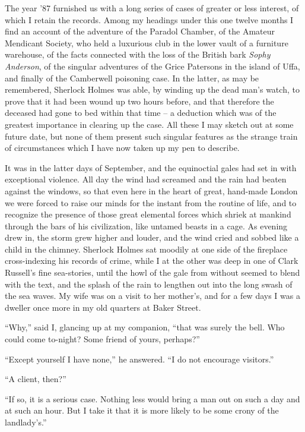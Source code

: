 The year ’87 furnished us with a long series of cases of
greater or less interest, of which I retain the records. Among
my headings under this one twelve months I find an account
of the adventure of the Paradol Chamber, of the Amateur
Mendicant Society, who held a luxurious club in the lower
vault of a furniture warehouse, of the facts connected with the
loss of the British bark \textit{Sophy Anderson}, of the singular
adventures of the Grice Patersons in the island of Uffa, and
finally of the Camberwell poisoning case. In the latter, as
may be remembered, Sherlock Holmes was able, by winding
up the dead man’s watch, to prove that it had been wound up
two hours before, and that therefore the deceased had gone to
bed within that time -- a deduction which was of the greatest
importance in clearing up the case. All these I may sketch
out at some future date, but none of them present such singular
features as the strange train of circumstances which I have
now taken up my pen to describe.

It was in the latter days of September, and the equinoctial
gales had set in with exceptional violence. All day the wind
had screamed and the rain had beaten against the windows,
so that even here in the heart of great, hand-made London we
were forced to raise our minds for the instant from the routine
of life, and to recognize the presence of those great elemental
forces which shriek at mankind through the bars of
his civilization, like untamed beasts in a cage. As evening
drew in, the storm grew higher and louder, and the wind cried
and sobbed like a child in the chimney. Sherlock Holmes
sat moodily at one side of the fireplace cross-indexing his
records of crime, while I at the other was deep in one of Clark
Russell’s fine sea-stories, until the howl of the gale from without
seemed to blend with the text, and the splash of the rain
to lengthen out into the long swash of the sea waves. My
wife was on a visit to her mother’s, and for a few days I was
a dweller once more in my old quarters at Baker Street.

“Why,” said I, glancing up at my companion, “that was
surely the bell. Who could come to-night? Some friend of
yours, perhaps?”

“Except yourself I have none,” he answered. “I do not encourage
visitors.”

“A client, then?”

“If so, it is a serious case. Nothing less would bring a
man out on such a day and at such an hour. But I take it
that it is more likely to be some crony of the landlady’s.”

